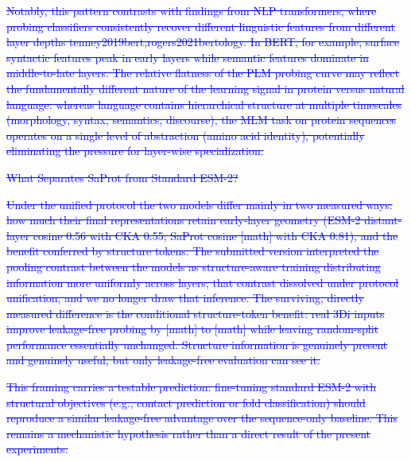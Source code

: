 \documentclass[11pt,a4paper]{article}
\begin{document}
\textcolor{blue}{\sout{Notably, this pattern contrasts with findings from NLP transformers, where
probing classifiers consistently recover different linguistic features from
different layer depths tenney2019bert,rogers2021bertology. In BERT, for example,
surface syntactic features peak in early layers while semantic features dominate
in middle-to-late layers. The relative flatness of the PLM probing curve may
reflect the fundamentally different nature of the learning signal in protein
versus natural language: whereas language contains hierarchical structure at
multiple timescales (morphology, syntax, semantics, discourse), the MLM task on
protein sequences operates on a single level of abstraction (amino acid identity),
potentially eliminating the pressure for layer-wise specialization.}}

\textcolor{blue}{\sout{What Separates SaProt from Standard ESM-2?}}

\textcolor{blue}{\sout{Under the unified protocol the two models differ mainly in two measured
ways: how much their final representations retain early-layer geometry (ESM-2
distant-layer cosine 0.56 with CKA 0.55; SaProt cosine [math] with CKA 0.81), and
the benefit conferred by structure tokens. The submitted version interpreted the
pooling contrast between the models as structure-aware training distributing
information more uniformly across layers; that contrast dissolved under protocol
unification, and we no longer draw that inference. The surviving, directly measured
difference is the conditional structure-token benefit: real 3Di inputs improve
leakage-free probing by [math] to [math] while leaving random-split performance
essentially unchanged. Structure information is genuinely present and genuinely
useful, but only leakage-free evaluation can see it.}}

\textcolor{blue}{\sout{This framing carries a testable prediction: fine-tuning standard ESM-2
with structural objectives (e.g., contact prediction or fold classification)
should reproduce a similar leakage-free advantage over the sequence-only baseline.
This remains a mechanistic hypothesis rather than a direct result of the present
experiments.}}
\end{document}
